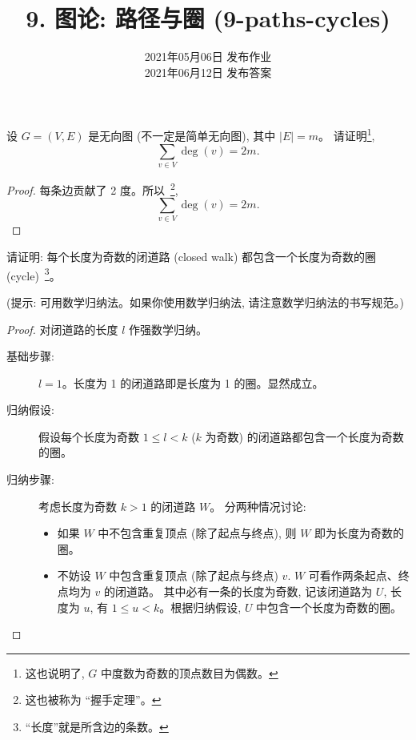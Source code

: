 \documentclass[a4paper, justified]{tufte-handout}
\title{9. 图论: 路径与圈 (9-paths-cycles)}
\date{2021年05月06日 发布作业 \\ 2021年06月12日 发布答案}
\begin{document}
\maketitle
\noplagiarism %
\begin{abstract}
\end{abstract}
\beginrequired

\begin{problem}
  设 $G = (V, E)$ 是无向图 (不一定是简单无向图),
  其中 $|E| = m$。
  请证明\footnote{这也说明了, $G$ 中度数为奇数的顶点数目为偶数。},
  \[
    \sum_{v \in V} \deg(v) = 2m.
  \]
\end{problem}

\begin{proof}
  每条边贡献了 2 度。所以~\footnote{这也被称为 ``握手定理''。},
  \[
    \sum_{v \in V} \deg(v) = 2m.
  \]
\end{proof}

\begin{problem}
  请证明: 每个长度为奇数的闭道路 (closed walk) 都包含一个长度为奇数的圈 (cycle)~\footnote{
    ``长度''就是所含边的条数。}。

  \vspace{1em}
  \noindent (提示: 可用数学归纳法。如果你使用数学归纳法, 请注意数学归纳法的书写规范。)
\end{problem}

\begin{proof}
  对闭道路的长度 $l$ 作强数学归纳。
  \begin{description}
    \item[基础步骤:] $l = 1$。长度为 1 的闭道路即是长度为 1 的圈。显然成立。
    \item[归纳假设:] 假设每个长度为奇数 $1 \le l < k$ ($k$ 为奇数)
      的闭道路都包含一个长度为奇数的圈。
    \item[归纳步骤:] 考虑长度为奇数 $k > 1$ 的闭道路 $W$。
      分两种情况讨论:
      \begin{itemize}
        \item 如果 $W$ 中不包含重复顶点 (除了起点与终点), 则 $W$ 即为长度为奇数的圈。
        \item 不妨设 $W$ 中包含重复顶点 (除了起点与终点) $v$.
          $W$ 可看作两条起点、终点均为 $v$ 的闭道路。
          其中必有一条的长度为奇数, 记该闭道路为 $U$, 长度为 $u$,
          有 $1 \le u < k$。根据归纳假设, $U$ 中包含一个长度为奇数的圈。
      \end{itemize}
  \end{description}
\end{proof}
\end{document}
